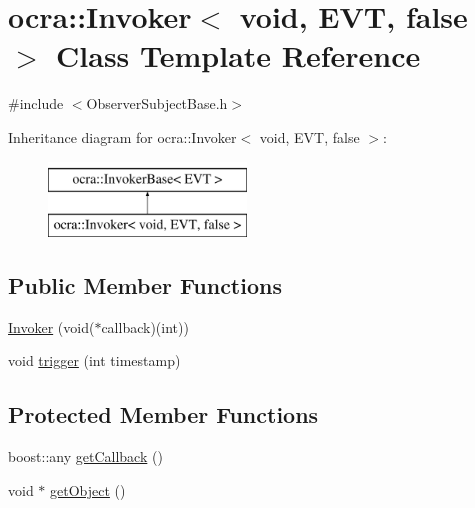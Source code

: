 \hypertarget{classocra_1_1Invoker_3_01void_00_01EVT_00_01false_01_4}{}\section{ocra\+:\+:Invoker$<$ void, E\+VT, false $>$ Class Template Reference}
\label{classocra_1_1Invoker_3_01void_00_01EVT_00_01false_01_4}


{\ttfamily \#include $<$Observer\+Subject\+Base.\+h$>$}

Inheritance diagram for ocra\+:\+:Invoker$<$ void, E\+VT, false $>$\+:\begin{figure}[H]
\begin{center}
\leavevmode
\includegraphics[height=2.000000cm]{d2/d1a/classocra_1_1Invoker_3_01void_00_01EVT_00_01false_01_4}
\end{center}
\end{figure}
\subsection*{Public Member Functions}
\begin{DoxyCompactItemize}
\item 
\hyperlink{classocra_1_1Invoker_3_01void_00_01EVT_00_01false_01_4_adbb4357c33d4e320a3a21916fd76fd80}{Invoker} (void($\ast$callback)(int))
\item 
void \hyperlink{classocra_1_1Invoker_3_01void_00_01EVT_00_01false_01_4_a483d45eb6e668e5c97b9861840f4d6ea}{trigger} (int timestamp)
\end{DoxyCompactItemize}
\subsection*{Protected Member Functions}
\begin{DoxyCompactItemize}
\item 
boost\+::any \hyperlink{classocra_1_1Invoker_3_01void_00_01EVT_00_01false_01_4_a28f6e1841ccdb09d1bfefbb529d51f79}{get\+Callback} ()
\item 
void $\ast$ \hyperlink{classocra_1_1Invoker_3_01void_00_01EVT_00_01false_01_4_a2d32f4dcaca9ae526b89e28cf2a3fc70}{get\+Object} ()
\end{DoxyCompactItemize}
